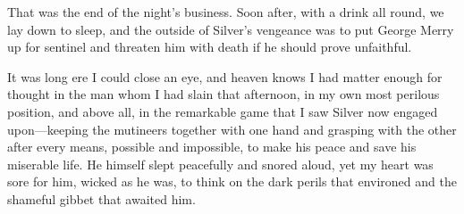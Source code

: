 That was the end of the night's business. Soon after, with a drink all round, we lay down to sleep, and the outside of Silver's vengeance was to put George Merry up for sentinel and threaten him with death if he should prove unfaithful.

It was long ere I could close an eye, and heaven knows I had matter enough for thought in the man whom I had slain that afternoon, in my own most perilous position, and above all, in the remarkable game that I saw Silver now engaged upon—keeping the mutineers together with one hand and grasping with the other after every means, possible and impossible, to make his peace and save his miserable life. He himself slept peacefully and snored aloud, yet my heart was sore for him, wicked as he was, to think on the dark perils that environed and the shameful gibbet that awaited him.